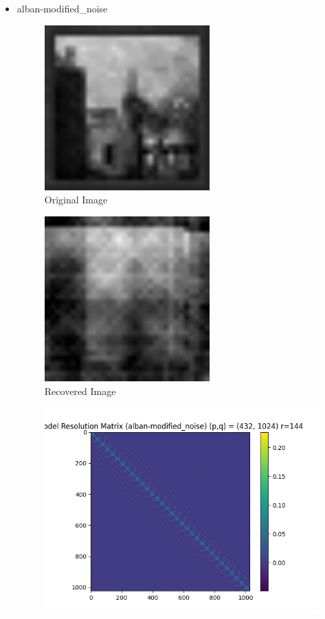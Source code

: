 \documentclass{article}
\begin{document}
\begin{itemize}
    \item alban-modified\_noise
    \begin{figure}[h]
        \centering
        \includegraphics[width=0.6\textwidth]{images/greyscale/alban-modified.png}
        \caption{Original Image}
    \end{figure}
    \begin{figure}[h]
        \centering
        \includegraphics[width=0.6\textwidth]{images/outputs/noise/alban-modified_noise.png}
        \caption{Recovered Image}
    \end{figure}
    \begin{figure}[h]
        \centering
        \includegraphics[width=1\textwidth]{images/outputs/modelres/alban-modified_noise.png}

\end{figure}
\end{itemize}
\end{document}
